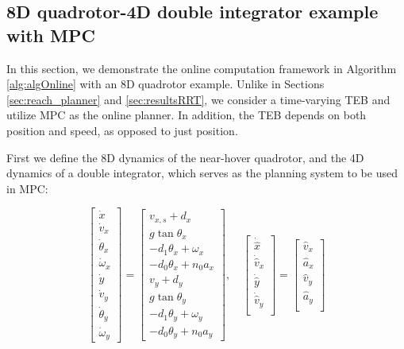 \subsection{8D quadrotor-4D double integrator example with MPC \label{sec:resultsMPC}}

In this section, we demonstrate the online computation framework in Algorithm \ref{alg:algOnline} with an 8D quadrotor example. 
Unlike in Sections \ref{sec:reach_planner} and \ref{sec:resultsRRT}, we consider a time-varying TEB and utilize MPC as the online planner.
In addition, the TEB depends on both position and speed, as opposed to just position.

First we define the 8D dynamics of the near-hover quadrotor, and the 4D dynamics of a double integrator, which serves as the planning system to be used in MPC:

\begin{equation}
\label{eq:Quad8D_dyn}
\begin{bmatrix}
\dot x\\
\dot v_x\\
\dot \theta_x\\
\dot \omega_x\\
\dot y\\
\dot v_y\\
\dot \theta_y\\
\dot \omega_y
\end{bmatrix} =
\begin{bmatrix}
v_{x,s} + d_x\\
g \tan \theta_x\\
-d_1 \theta_x + \omega_x\\
-d_0 \theta_x + n_0 a_x\\
v_y + d_y\\
g \tan \theta_y\\
-d_1 \theta_y + \omega_y\\
-d_0 \theta_y + n_0 a_y
\end{bmatrix}, \quad
\begin{bmatrix}
\dot {\hat x}\\
\dot {\hat v}_x\\
\dot {\hat y}\\
\dot {\hat v}_y\\
\end{bmatrix} =
\begin{bmatrix}
\hat v_x\\
\hat a_x\\
\hat v_y\\
\hat a_y\\
\end{bmatrix}
\end{equation}

